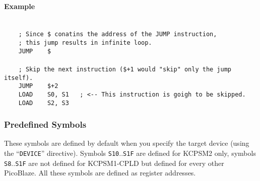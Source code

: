             \paragraph{Example}
                ~\\
                \verb'    ; Since $ conatins the address of the JUMP instruction,'\\
                \verb'    ; this jump results in infinite loop.'\\
                \verb'    JUMP    $'\\
                \verb''\\
                \verb'    ; Skip the next instruction ($+1 would "skip" only the jump itself).'\\
                \verb'    JUMP    $+2'\\
                \verb'    LOAD    S0, S1   ; <-- This instruction is goigh to be skipped.'\\
                \verb'    LOAD    S2, S3'

        \clearpage
        \subsubsection{Predefined Symbols}
            These symbols are defined by default when you specify the target device (using the ``\texttt{DEVICE}'' directive). Symbols \texttt{S10}..\texttt{S1F} are defined for KCPSM2 only, symbols \texttt{S8}..\texttt{S1F} are not defined for KCPSM1-CPLD but defined for every other PicoBlaze. All these symbols are defined as register addresses.


